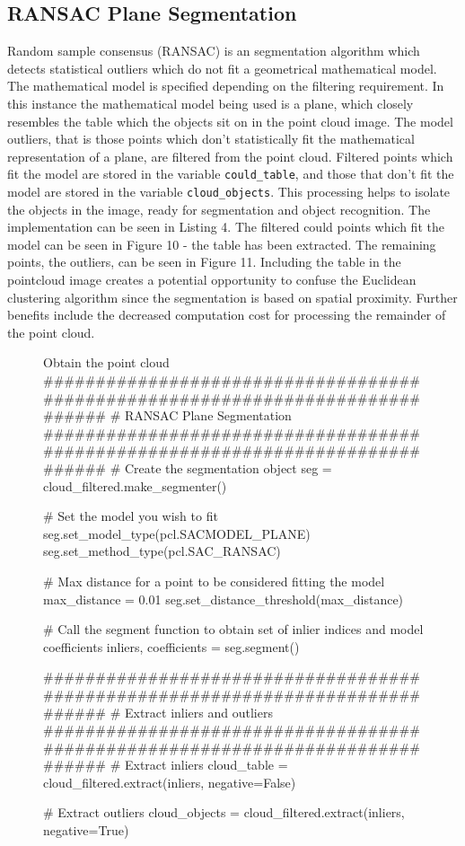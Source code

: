 \documentclass[a4paper]{article}
\begin{document}
\newpage

\subsection{RANSAC Plane Segmentation}
Random sample consensus (RANSAC) is an segmentation algorithm which detects statistical outliers which do not fit a geometrical mathematical model. The mathematical model is specified depending on the filtering requirement. In this instance the mathematical model being used is a plane, which closely resembles the table which the objects sit on in the point cloud image. The model outliers, that is those points which don't statistically fit the mathematical representation of a plane, are filtered from the point cloud. Filtered points which fit the model are stored in the variable \verb|could_table|, and those that don't fit the model are stored in the variable \verb|cloud_objects|. This processing helps to isolate the objects in the image, ready for segmentation and object recognition. The implementation can be seen in Listing 4. The filtered could points which fit the model can be seen in Figure 10 - the table has been extracted. The remaining points, the outliers, can be seen in Figure 11. Including the table in the pointcloud image creates a potential opportunity to confuse the Euclidean clustering algorithm since the segmentation is based on spatial proximity. Further benefits include the decreased computation cost for processing the remainder of the point cloud.

\vspace{0.25cm}

\begin{figure}[h]\scriptsize
\begin{sexylisting}{Obtain the point cloud}
##############################################################################
    # RANSAC Plane Segmentation
##############################################################################
    # Create the segmentation object
    seg = cloud_filtered.make_segmenter()

    # Set the model you wish to fit
    seg.set_model_type(pcl.SACMODEL_PLANE)
    seg.set_method_type(pcl.SAC_RANSAC)

    # Max distance for a point to be considered fitting the model
    max_distance = 0.01
    seg.set_distance_threshold(max_distance)

    # Call the segment function to obtain set of inlier indices and model coefficients
    inliers, coefficients = seg.segment()
    
##############################################################################
    # Extract inliers and outliers
##############################################################################
    # Extract inliers
    cloud_table = cloud_filtered.extract(inliers, negative=False)

    # Extract outliers
    cloud_objects = cloud_filtered.extract(inliers, negative=True)
\end{sexylisting}
\end{figure}
\end{document}

